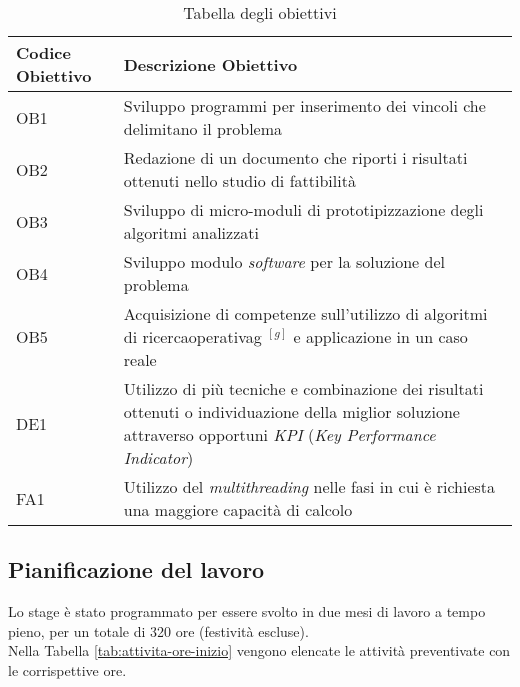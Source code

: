 \begin{center}
    \begin{longtable}{m{3cm}m{9cm}}
    \caption{Tabella degli obiettivi}
    \label{tab:obiettivi}
    \\ \hline
    \centering \textbf{Codice Obiettivo} & \centering \textbf{Descrizione Obiettivo} \arraybackslash \\
    \hline
    \centering OB1 & Sviluppo programmi per inserimento
    dei vincoli che delimitano il problema \arraybackslash \\
    \hline
    \centering OB2 & Redazione di un documento che riporti
    i risultati ottenuti nello studio di fattibilità \arraybackslash \\
    \hline
    \centering OB3 & Sviluppo di micro-moduli di prototipizzazione degli algoritmi analizzati \arraybackslash \\
    \hline
    \centering OB4 & Sviluppo modulo \textit{software} per
    la soluzione del problema \arraybackslash \\
    \hline
    \centering OB5 & Acquisizione di competenze sull’utilizzo
    di algoritmi di \gls{ricercaoperativag} $^{[g]}$ e
    applicazione in un caso reale \arraybackslash \\
    \hline
    \centering DE1 & Utilizzo di più tecniche e combinazione dei risultati
    ottenuti o individuazione della miglior soluzione attraverso
    opportuni \textit{KPI} (\textit{Key Performance Indicator}) \arraybackslash \\
    \hline
    \centering FA1 & Utilizzo del \textit{multithreading}
    nelle fasi in cui è richiesta una
    maggiore capacità di calcolo \arraybackslash \\
    \hline
    \end{longtable}
\end{center}%

\subsection{Pianificazione del lavoro}
\label{sec:pianificazione-lavoro}
\noindent Lo stage è stato programmato per essere svolto in due mesi di lavoro
a tempo pieno, per un totale di 320 ore (festività escluse).\\
\noindent Nella Tabella \ref{tab:attivita-ore-inizio} vengono elencate
le attività preventivate con le corrispettive ore.

\renewcommand{\arraystretch}{1.55}

